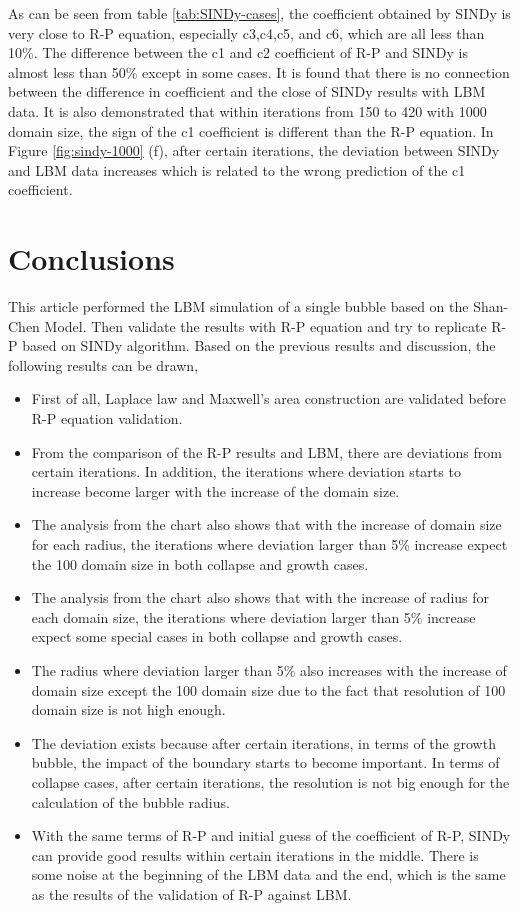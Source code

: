 \documentclass[review]{elsarticle}
\begin{document}
As can be seen from table \ref{tab:SINDy-cases}, the coefficient obtained by SINDy is very close to R-P equation, especially c3,c4,c5, and c6, which are all less than 10\%. The difference between the c1 and c2 coefficient of R-P and SINDy is almost less than 50\% except in some cases. It is found that there is no connection between the difference in coefficient and the close of SINDy results with LBM data. It is also demonstrated that within iterations from 150 to 420 with 1000 domain size, the sign of the c1 coefficient is different than the R-P equation. In Figure \ref{fig:sindy-1000} (f), after certain iterations, the deviation between SINDy and LBM data increases which is related to the wrong prediction of the c1 coefficient.  
\section{Conclusions}
This article performed the LBM simulation of a single bubble based on the Shan-Chen Model. Then validate the results with R-P equation and try to replicate R-P based on SINDy algorithm. Based on the previous results and discussion, the following results can be drawn,
\begin{itemize}
	\item First of all, Laplace law and Maxwell's area construction are validated before R-P equation validation.
	\item From the comparison of the R-P results and LBM, there are deviations from certain iterations. In addition, the iterations where deviation starts to increase become larger with the increase of the domain size. 
	\item The analysis from the chart also shows that with the increase of domain size for each radius, the iterations where deviation larger than 5\% increase expect the 100 domain size in both collapse and growth cases.
	\item The analysis from the chart also shows that with the increase of radius for each domain size, the iterations where deviation larger than 5\% increase expect some special cases in both collapse and growth cases.
	\item The radius where deviation larger than 5\% also increases with the increase of domain size except the 100 domain size due to the fact that resolution of 100 domain size is not high enough. 
	\item The deviation exists because after certain iterations, in terms of the growth bubble, the impact of the boundary starts to become important. In terms of collapse cases, after certain iterations, the resolution is not big enough for the calculation of the bubble radius.
	\item With the same terms of R-P and initial guess of the coefficient of R-P, SINDy can provide good results within certain iterations in the middle. There is some noise at the beginning of the LBM data and the end, which is the same as the results of the validation of R-P against LBM.
\end{itemize}
\end{document}
